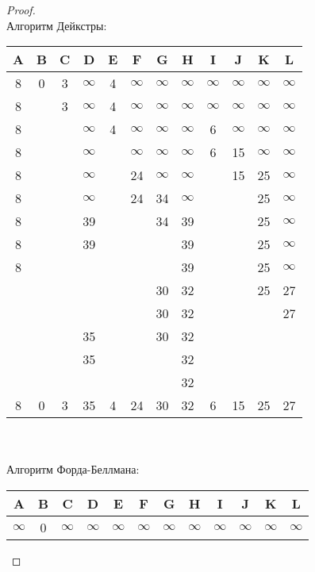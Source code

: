 \begin{proof} $ $ \\
Алгоритм Дейкстры: \\
\begin{tabular}{c|c|c|c|c|c|c|c|c|c|c|c}
    A & B & C & D & E & F & G & H & I & J & K & L \\
    \hline
    8 & 0 & 3 & $\infty$ & 4 & $\infty$ & $\infty$ & $\infty$ & $\infty$ & $\infty$ & $\infty$ & $\infty$ \\
8 & $ $ & 3 & $\infty$ & 4 & $\infty$ & $\infty$ & $\infty$ & $\infty$ & $\infty$ & $\infty$ & $\infty$ \\
8 & $ $ & $ $ & $\infty$ & 4 & $\infty$ & $\infty$ & $\infty$ & 6 & $\infty$ & $\infty$ & $\infty$ \\
8 & $ $ & $ $ & $\infty$ & $ $ & $\infty$ & $\infty$ & $\infty$ & 6 & 15 & $\infty$ & $\infty$ \\
8 & $ $ & $ $ & $\infty$ & $ $ & 24 & $\infty$ & $\infty$ & $ $ & 15 & 25 & $\infty$ \\
8 & $ $ & $ $ & $\infty$ & $ $ & 24 & 34 & $\infty$ & $ $ & $ $ & 25 & $\infty$ \\
8 & $ $ & $ $ & 39 & $ $ & $ $ & 34 & 39 & $ $ & $ $ & 25 & $\infty$ \\
8 & $ $ & $ $ & 39 & $ $ & $ $ & $ $ & 39 & $ $ & $ $ & 25 & $\infty$ \\
8 & $ $ & $ $ & $ $ & $ $ & $ $ & $ $ & 39 & $ $ & $ $ & 25 & $\infty$ \\
$ $ & $ $ & $ $ & $ $ & $ $ & $ $ & 30 & 32 & $ $ & $ $ & 25 & 27 \\
$ $ & $ $ & $ $ & $ $ & $ $ & $ $ & 30 & 32 & $ $ & $ $ & $ $ & 27 \\
$ $ & $ $ & $ $ & 35 & $ $ & $ $ & 30 & 32 & $ $ & $ $ & $ $ & $ $ \\
$ $ & $ $ & $ $ & 35 & $ $ & $ $ & $ $ & 32 & $ $ & $ $ & $ $ & $ $ \\
$ $ & $ $ & $ $ & $ $ & $ $ & $ $ & $ $ & 32 & $ $ & $ $ & $ $ & $ $ \\
\hline
8 & 0 & 3 & 35 & 4 & 24 & 30 & 32 & 6 & 15 & 25 & 27 \\
\end{tabular}
\\\\
Алгоритм Форда-Беллмана:\\
\begin{tabular}{c|c|c|c|c|c|c|c|c|c|c|c}
    A & B & C & D & E & F & G & H & I & J & K & L \\
    \hline
    $\infty$ & 0 & $\infty$ & $\infty$ & $\infty$ & $\infty$ & $\infty$ & $\infty$ & $\infty$ & $\infty$ & $\infty$ & $\infty$ \\

\end{tabular}
\end{proof}
